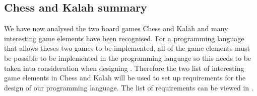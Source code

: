 \subsection{Chess and Kalah summary}
\label{subsec:summery}

We have now analysed the two board games Chess and Kalah and many interesting game elements have been recognised. For a programming language that allows theses two games to be implemented, all of the game elements must be possible to be implemented in the programming language so this needs to be taken into consideration when designing \productname{}. Therefore the two list of interesting game elements in Chess and Kalah will be used to set up requirements for the design of our programming language. The list of requirements can be viewed in .


 
